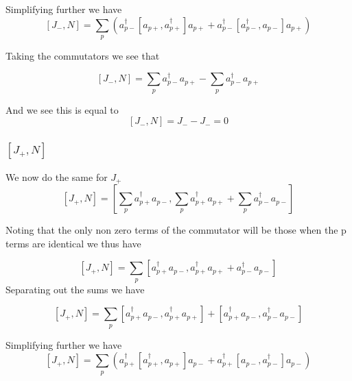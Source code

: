 \documentclass[11pt]{article} %
\begin{document}
Simplifying further we have\\

\begin{equation}
\left[J_-,N\right]=\sum_p\left( a_{p-}^\dagger\left[ a_{p+},  a_{p+}^\dagger \right] a_{p+}+ a_{p-}^\dagger\left[ a_{p-}^\dagger,  a_{p-} \right] a_{p+}\right)
\end{equation}

Taking the commutators we see that\

\begin{equation}
\left[J_-,N\right]=\sum_p a_{p-}^\dagger a_{p+} -\sum_p a_{p-}^\dagger a_{p+}
\end{equation}

And we see this is equal to\\
\begin{equation}
\left[J_-,N\right]=J_- -J_-=0
\end{equation}

\subsubsection{$\left[J_+,N\right]$}
We now do the same for $J_+$\\

\begin{equation}
\left[J_+,N\right]=\left[\sum_p a_{p+}^\dagger a_{p-}, \sum_p a_{p+}^\dagger a_{p+} +\sum_p a_{p-}^\dagger a_{p-}\right]
\end{equation}

Noting that the only non zero terms of the commutator will be those when the p terms are identical we thus have

\begin{equation}
\left[J_+,N\right]=\sum_p\left[ a_{p+}^\dagger a_{p-},  a_{p+}^\dagger a_{p+} + a_{p-}^\dagger a_{p-}\right]
\end{equation}
Separating out the sums we have


\begin{equation}
\left[J_+,N\right]=\sum_p\left[ a_{p+}^\dagger a_{p-},  a_{p+}^\dagger a_{p+} \right]+\left[ a_{p+}^\dagger a_{p-},  a_{p-}^\dagger a_{p-}\right]
\end{equation}

Simplifying further we have\\

\begin{equation}
\left[J_+,N\right]=\sum_p\left( a_{p+}^\dagger\left[ a_{p+}^\dagger,  a_{p+} \right] a_{p-}+ a_{p+}^\dagger\left[ a_{p-},  a_{p-}^\dagger \right] a_{p-}\right)
\end{equation}
\end{document}
